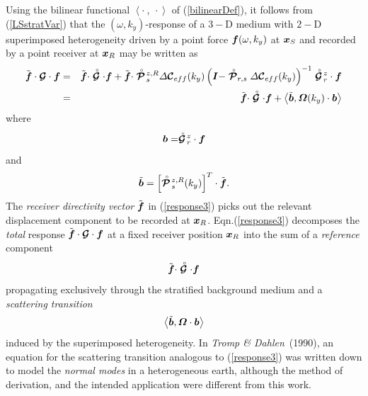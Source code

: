 

Using the bilinear functional $\left\langle{ \cdot \ ,\ \cdot 
}\right\rangle$ of 
(\ref{bilinearDef}), it follows from (\ref{LSstratVar}) that the 
$(\omega,k_y)$-response of a $3-$D  medium with $2-$D superimposed
 heterogeneity driven by a point force ${\bmi 
 f}(\omega,k_y)$ at ${\bmi  x}_S$ and recorded by a point receiver at  
${\bmi  x}_R$ may
be written as
\begin{eqnarray} \label{response3}
\tilde{\bmi f}\cdot{\CB G}\cdot{\bmi f}&=&
\tilde{\bmi f}\cdot\rf{\CB G}\cdot{\bmi f}+
\tilde{\bmi f}\cdot\rf{\CB P}\!{}^{z,R}_{s} 
{\mit \Delta}{\CB C}{}_{eff}(k_y)
\left({\bmi I} -  
\rf{\CB P}_{r,s}
{\mit \Delta}{\CB C}{}_{eff}(k_y)\right)^{-1} 
\rf{\CB G}\!{}^{z}_{r}\cdot{\bmi f}\nonumber\\
&=&\tilde{\bmi f}\cdot\rf{\CB G}\cdot{\bmi f}+ 
\left\langle\tilde{\bmi b} , {\bmi  \Omega} (k_y)\cdot {\bmi b} 
\right\rangle
\end{eqnarray}
where
\begin{equation} \label{bvardef}
{\bmi b}= \rf{\CB G}\!{}^{z}_{r}\cdot{\bmi f}
\end{equation}
and
\begin{equation} \label{btdef}
\tilde{\bmi b}= \left[\rf{\CB P}\!{}^{z,R}_{s}(k_y)\right]^{T}\cdot 
\tilde{\bmi f}.
\end{equation}
The {\em receiver directivity vector\/} $\tilde{\bmi f}$ 
in (\ref{response3}) picks out the relevant displacement component to be 
recorded at ${\bmi 
x}_R$.
Eqn.(\ref{response3}) decomposes the {\em total\/} response $\tilde{\bmi 
f}\cdot{\CB G}\cdot{\bmi f}$ at a fixed 
receiver position ${\bmi x}_R$ into the sum of a {\em reference\/} 
component
\begin{equation} \label{refcomponent}
\tilde{\bmi f}\cdot\rf{\CB G}\cdot{\bmi f}
\end{equation} 
propagating exclusively through the stratified background medium and a 
{\em scattering transition\/} 
\begin{equation} \label{scattransition}
\left\langle\tilde{\bmi b} , {\bmi  \Omega} 
\cdot {\bmi b} \right\rangle
\end{equation}
induced by the superimposed heterogeneity. 
In {\em Tromp \& Dahlen\/}~(1990), an equation for the scattering 
transition analogous to (\ref{response3}) 
was written down to model the {\em normal modes\/} in a heterogeneous 
earth, although the method of derivation, and the intended application 
were 
different from this work.

